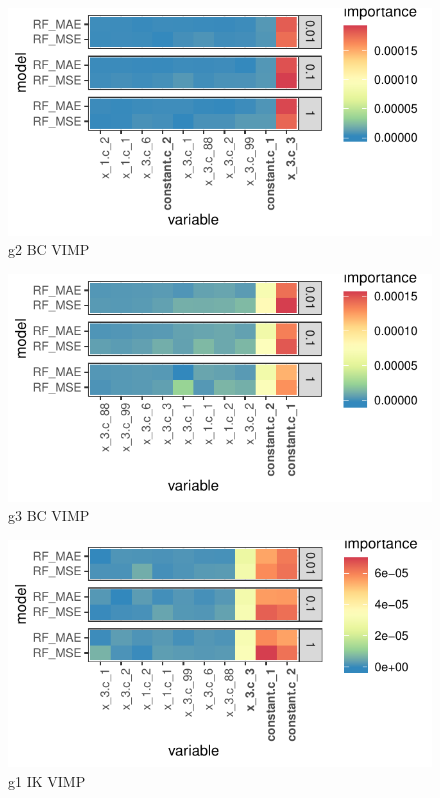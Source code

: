 \documentclass{article}
\begin{document}
\begin{figure}
	\includegraphics[]{../../Results/simulation/graphics/simulation_g2_vimp_bc.pdf}
	\caption{g2 BC VIMP}
\end{figure}

\begin{figure}
	\includegraphics[]{../../Results/simulation/graphics/simulation_g3_vimp_bc.pdf}
	\caption{g3 BC VIMP}
\end{figure}


\begin{figure}
	\includegraphics[]{../../Results/simulation/graphics/simulation_g1_vimp_ik.pdf}
	\caption{g1 IK VIMP}
\end{figure}
\end{document}
